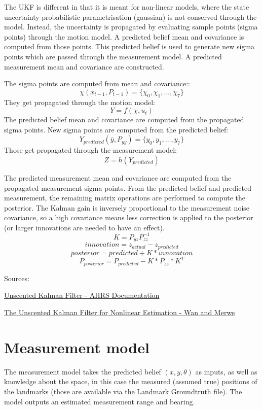 \documentclass{article}
\begin{document}
The UKF is different in that it is meant for non-linear models, where the state uncertainty probabilistic parametrisation (gaussian) is not conserved through the model. Instead, the uncertainty is propagated by evaluating sample points (sigma points) through the motion model. A predicted belief mean and covariance is computed from those points. This predicted belief is used to generate new sigma points which are passed through the measurement model. A predicted measurement mean and covariance are constructed.

The sigma points are computed from mean and covariance::
\[\chi(x_{t-1},P_{t-1})=\{\chi_0, \chi_1, \dots, \chi_{7}\}\]
They get propagated through the motion model:
\[Y=f(\chi, u_t)\]
The predicted belief mean and covariance are computed from the propagated sigma points. New sigma points are computed from the predicted belief:
\[Y_{predicted}(\bar{y},P_{yy})=\{y_0, y_1, \dots, y_{7}\}\]
Those get propagated through the measurement model:
\[Z=h(Y_{predicted})\]

The predicted measurement mean and covariance are computed from the propagated measurement sigma points.
From the predicted belief and predicted measurement, the remaining matrix operations are performed to compute the posterior. The Kalman gain is inversely proportional to the measurement noise covariance, so a high covariance means less correction is applied to the posterior (or larger innovations are needed to have an effect).
\[K=P_{yz}P_{zz}^{-1}\]
\[innovation=z_{actual}-z_{predicted}\]
\[posterior=predicted+K*innovation\]
\[P_{posterior}=P_{predicted}-K*P_{zz}*K^T\]

Sources: 

\href{https://ahrs.readthedocs.io/en/latest/filters/ukf.html}{Unscented Kalman Filter - AHRS Documentation}

\href{https://groups.seas.harvard.edu/courses/cs281/papers/unscented.pdf}{The Unscented Kalman Filter for Nonlinear Estimation - Wan and Merwe}

\section{Measurement model}

The measurement model takes the predicted belief $(x, y, \theta)$ as inputs, as well as knowledge about the space, in this case the measured (assumed true) positions of the landmarks (those are available via the Landmark Groundtruth file).
The model outputs an estimated measurement range and bearing.
\end{document}
